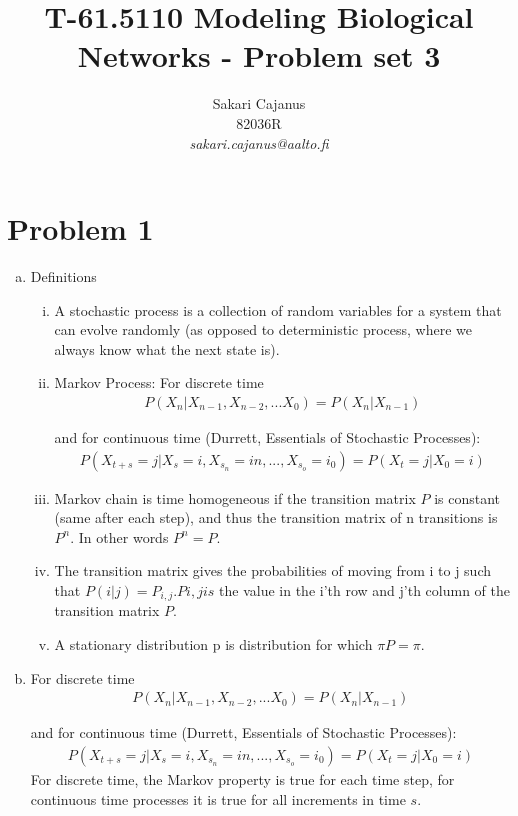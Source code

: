 \documentclass[a4paper]{article}
\title{T-61.5110 Modeling Biological Networks - Problem set 3}
\author{Sakari Cajanus\\ 82036R \\
       {\it sakari.cajanus@aalto.fi}}
\begin{document}
\maketitle


\newpage

\section*{Problem 1}
\begin{enumerate}[a.]
    \item Definitions
        \begin{enumerate}[i.]
\item A stochastic process is a collection of random variables for a system that can evolve
randomly (as opposed to deterministic process, where we always know what the next
state is).
\item Markov Process: For discrete time
\begin{align}
P(X_n|X_{n-1},X_{n-2},...X_{0}) = P(X_{n}|X_{n-1})
\end{align}

and for continuous time (Durrett, Essentials of Stochastic Processes):
\begin{align}
P(X_{t+s}= j|X_{s}= i,X_{s_n}= in,...,X_{s_o}= i_0) = P(X_{t}= j|X_{0}= i)
\end{align}
\item Markov chain is time homogeneous if the transition matrix $P$ is constant (same
after each step), and thus the transition matrix of n transitions is $P^n$. In other words
$P^n=P$.
\item The transition matrix gives the probabilities of moving from i to j such that
$P(i|j) = P_{i,j}. P{i,jis}$ the value in the i'th row and j'th column of the transition matrix
$P$.
\item A stationary distribution p is distribution for which $\pi P = \pi$.
        \end{enumerate}
\item For discrete time
\begin{align}
P(X_n|X_{n-1},X_{n-2},...X_{0}) = P(X_{n}|X_{n-1})
\end{align}

and for continuous time (Durrett, Essentials of Stochastic Processes):
\begin{align}
P(X_{t+s}= j|X_{s}= i,X_{s_n}= in,...,X_{s_o}= i_0) = P(X_{t}= j|X_{0}= i)
\end{align}
For discrete time, the Markov property is true for each time step, for
continuous time processes it is true for all increments in time $s$.



\end{enumerate}
\end{document}
